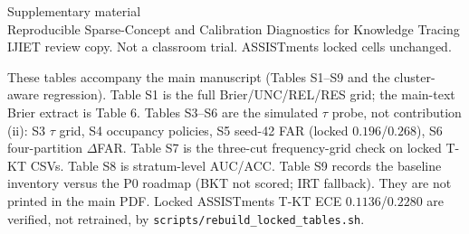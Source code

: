 \documentclass[11pt,a4paper]{article}
\begin{document}
\begin{center}
{\large Supplementary material}\\[4pt]
{\normalsize Reproducible Sparse-Concept and Calibration Diagnostics for Knowledge Tracing}\\[2pt]
{\small IJIET review copy. Not a classroom trial. ASSISTments locked cells unchanged.}
\end{center}
\vspace{0.8em}
\noindent These tables accompany the main manuscript (Tables S1--S9 and the cluster-aware regression). Table S1 is the full Brier/UNC/REL/RES grid; the main-text Brier extract is Table 6. Tables S3--S6 are the simulated $\tau$ probe, not contribution (ii): S3 $\tau$ grid, S4 occupancy policies, S5 seed-42 FAR (locked $0.196$/$0.268$), S6 four-partition $\Delta$FAR. Table S7 is the three-cut frequency-grid check on locked T-KT CSVs. Table S8 is stratum-level AUC/ACC. Table S9 records the baseline inventory versus the P0 roadmap (BKT not scored; IRT fallback). They are not printed in the main PDF. Locked ASSISTments T-KT ECE $0.1136$/$0.2280$ are verified, not retrained, by \texttt{scripts/rebuild\_locked\_tables.sh}.











\end{document}
